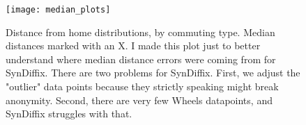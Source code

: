 
        \begin{figure}
        \begin{center}
        \texttt{[image: median\_plots]}
        \caption{Distance from home distributions, by commuting type. Median distances marked with an X. I made this plot just to better understand where median distance errors were coming from for SynDiffix. There are two problems for SynDiffix. First, we adjust the "outlier" data points because they strictly speaking might break anonymity. Second, there are very few Wheels datapoints, and SynDiffix struggles with that. 
        }
        \label{fig:median_plots}
        \end{center}
        \end{figure}
    
